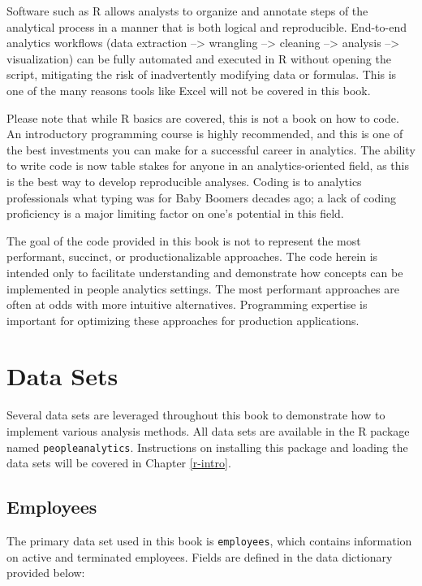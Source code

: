 \documentclass[
]{book}
\begin{document}
Software such as R allows analysts to organize and annotate steps of the analytical process in a manner that is both logical and reproducible. End-to-end analytics workflows (data extraction --\textgreater{} wrangling --\textgreater{} cleaning --\textgreater{} analysis --\textgreater{} visualization) can be fully automated and executed in R without opening the script, mitigating the risk of inadvertently modifying data or formulas. This is one of the many reasons tools like Excel will not be covered in this book.

Please note that while R basics are covered, this is not a book on how to code. An introductory programming course is highly recommended, and this is one of the best investments you can make for a successful career in analytics. The ability to write code is now table stakes for anyone in an analytics-oriented field, as this is the best way to develop reproducible analyses. Coding is to analytics professionals what typing was for Baby Boomers decades ago; a lack of coding proficiency is a major limiting factor on one's potential in this field.

The goal of the code provided in this book is not to represent the most performant, succinct, or productionalizable approaches. The code herein is intended only to facilitate understanding and demonstrate how concepts can be implemented in people analytics settings. The most performant approaches are often at odds with more intuitive alternatives. Programming expertise is important for optimizing these approaches for production applications.

\hypertarget{data-sets}{%
\section{Data Sets}\label{data-sets}}

Several data sets are leveraged throughout this book to demonstrate how to implement various analysis methods. All data sets are available in the R package named \texttt{peopleanalytics}. Instructions on installing this package and loading the data sets will be covered in Chapter \ref{r-intro}.

\hypertarget{employees}{%
\subsection{Employees}\label{employees}}

The primary data set used in this book is \texttt{employees}, which contains information on active and terminated employees. Fields are defined in the data dictionary provided below:
\end{document}

